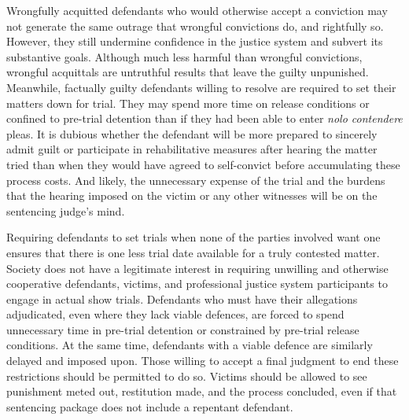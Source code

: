 Wrongfully acquitted defendants who would otherwise accept a conviction may not generate the same outrage that wrongful convictions do, and rightfully so. However, they still undermine confidence in the justice system and subvert its substantive goals. Although much less harmful than wrongful convictions, wrongful acquittals are untruthful results that leave the guilty unpunished. Meanwhile, factually guilty defendants willing to resolve are required to set their matters down for trial. They may spend more time on release conditions or confined to pre-trial detention than if they had been able to enter \textit{nolo contendere} pleas. It is dubious whether the defendant will be more prepared to sincerely admit guilt or participate in rehabilitative measures after hearing the matter tried than when they would have agreed to self-convict before accumulating these process costs. And likely, the unnecessary expense of the trial and the burdens that the hearing imposed on the victim or any other witnesses will be on the sentencing judge's mind.

Requiring defendants to set trials when none of the parties involved want one ensures that there is one less trial date available for a truly contested matter. Society does not have a legitimate interest in requiring unwilling and otherwise cooperative defendants, victims, and professional justice system participants to engage in actual show trials. Defendants who must have their allegations adjudicated, even where they lack viable defences, are forced to spend unnecessary time in pre-trial detention or constrained by pre-trial release conditions. At the same time, defendants with a viable defence are similarly delayed and imposed upon. Those willing to accept a final judgment to end these restrictions should be permitted to do so. Victims should be allowed to see punishment meted out, restitution made, and the process concluded, even if that sentencing package does not include a repentant defendant. 